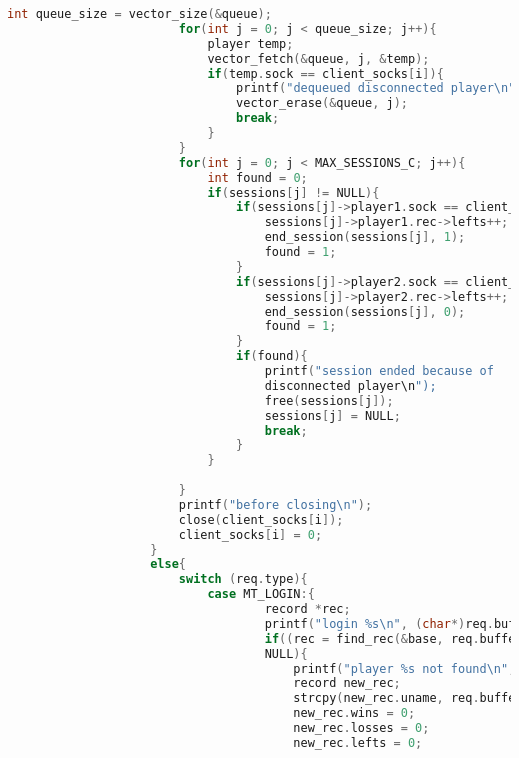 \documentclass[12pt]{article}
\begin{document}
\begin{lstlisting}[language=C, basicstyle=\scriptsize]
                        int queue_size = vector_size(&queue);
                        for(int j = 0; j < queue_size; j++){
                            player temp;
                            vector_fetch(&queue, j, &temp);
                            if(temp.sock == client_socks[i]){
                                printf("dequeued disconnected player\n");
                                vector_erase(&queue, j);
                                break;
                            }
                        }
                        for(int j = 0; j < MAX_SESSIONS_C; j++){
                            int found = 0;
                            if(sessions[j] != NULL){
                                if(sessions[j]->player1.sock == client_socks[i]){
                                    sessions[j]->player1.rec->lefts++;
                                    end_session(sessions[j], 1);
                                    found = 1;
                                }
                                if(sessions[j]->player2.sock == client_socks[i]){
                                    sessions[j]->player2.rec->lefts++;
                                    end_session(sessions[j], 0);
                                    found = 1;
                                }
                                if(found){
                                    printf("session ended because of
                                    disconnected player\n");
                                    free(sessions[j]);
                                    sessions[j] = NULL;
                                    break;
                                }
                            }
                            
                        }
                        printf("before closing\n");
                        close(client_socks[i]);
                        client_socks[i] = 0;
                    }
                    else{
                        switch (req.type){
                            case MT_LOGIN:{
                                    record *rec;
                                    printf("login %s\n", (char*)req.buffer);
                                    if((rec = find_rec(&base, req.buffer)) ==
                                    NULL){
                                        printf("player %s not found\n", (char*)req.buffer);
                                        record new_rec;
                                        strcpy(new_rec.uname, req.buffer);
                                        new_rec.wins = 0;
                                        new_rec.losses = 0;
                                        new_rec.lefts = 0;


\end{lstlisting}
\end{document}

